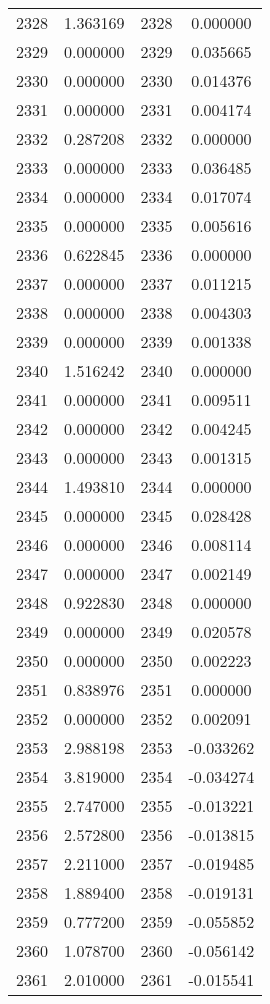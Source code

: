 \documentclass[12pt]{article}
\begin{document}
\begin{longtable}{@{}cccc@{}}
2328 & 1.363169 & 2328 & 0.000000 \\
2329 & 0.000000 & 2329 & 0.035665 \\
2330 & 0.000000 & 2330 & 0.014376 \\
2331 & 0.000000 & 2331 & 0.004174 \\
2332 & 0.287208 & 2332 & 0.000000 \\
2333 & 0.000000 & 2333 & 0.036485 \\
2334 & 0.000000 & 2334 & 0.017074 \\
2335 & 0.000000 & 2335 & 0.005616 \\
2336 & 0.622845 & 2336 & 0.000000 \\
2337 & 0.000000 & 2337 & 0.011215 \\
2338 & 0.000000 & 2338 & 0.004303 \\
2339 & 0.000000 & 2339 & 0.001338 \\
2340 & 1.516242 & 2340 & 0.000000 \\
2341 & 0.000000 & 2341 & 0.009511 \\
2342 & 0.000000 & 2342 & 0.004245 \\
2343 & 0.000000 & 2343 & 0.001315 \\
2344 & 1.493810 & 2344 & 0.000000 \\
2345 & 0.000000 & 2345 & 0.028428 \\
2346 & 0.000000 & 2346 & 0.008114 \\
2347 & 0.000000 & 2347 & 0.002149 \\
2348 & 0.922830 & 2348 & 0.000000 \\
2349 & 0.000000 & 2349 & 0.020578 \\
2350 & 0.000000 & 2350 & 0.002223 \\
2351 & 0.838976 & 2351 & 0.000000 \\
2352 & 0.000000 & 2352 & 0.002091 \\
2353 & 2.988198 & 2353 & -0.033262 \\
2354 & 3.819000 & 2354 & -0.034274 \\
2355 & 2.747000 & 2355 & -0.013221 \\
2356 & 2.572800 & 2356 & -0.013815 \\
2357 & 2.211000 & 2357 & -0.019485 \\
2358 & 1.889400 & 2358 & -0.019131 \\
2359 & 0.777200 & 2359 & -0.055852 \\
2360 & 1.078700 & 2360 & -0.056142 \\
2361 & 2.010000 & 2361 & -0.015541 \\

\end{longtable}
\end{document}
